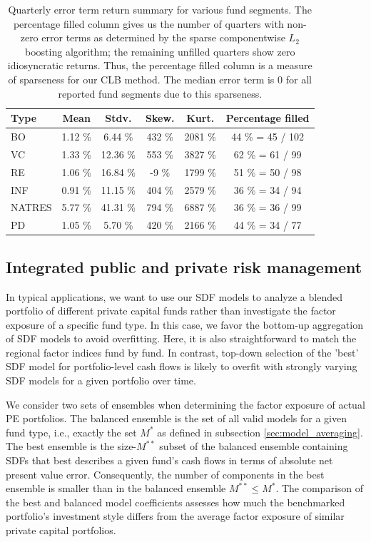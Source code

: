 \documentclass[12pt]{article}
\begin{document}
\begin{table}[ht]
	\centering
	\begin{tabular}{l | c c c c | c}
		Type & Mean  & Stdv. & Skew. & Kurt.  & Percentage filled \\ 
		\hline 
		\hline
		BO & 1.12 \% & 6.44 \% & 432 \% & 2081 \% & 44 \% = 45 / 102  \\ 
		VC & 1.33 \% & 12.36 \% &  553 \% & 3827 \% & 62 \% = 61 / 99 \\ 
		RE & 1.06 \% & 16.84 \% & -9 \% & 1799 \% & 51 \% = 50 / 98 \\ 
		INF & 0.91 \% & 11.15 \% & 404 \% & 2579 \% & 36 \% = 34 / 94  \\ 
		NATRES  & 5.77 \% & 41.31 \% & 794 \% & 6887 \% & 36 \% = 36 / 99 \\ 
		PD & 1.05 \% & 5.70 \% & 420 \% & 2166 \% & 44 \% = 34 / 77 \\ 
		\hline 
		\hline 
	\end{tabular} 
	\caption{
		Quarterly error term return summary for various fund segments.
		The percentage filled column gives us the number of quarters with non-zero error terms as determined by the sparse componentwise $L_2$ boosting algorithm; the remaining unfilled quarters show zero idiosyncratic returns.
		Thus, the percentage filled column is a measure of sparseness for our CLB method.
		The median error term is 0 for all reported fund segments due to this sparseness.
	}
\label{tab:error_summary}
\end{table}

\iffalse

\subsection{Integrated public and private risk management}
\label{sec:integrated_risk}

In typical applications, we want to use our SDF models to analyze a blended portfolio of different private capital funds rather than investigate the factor exposure of a specific fund type.
In this case, we favor the bottom-up aggregation of SDF models to avoid overfitting.
Here, it is also straightforward to match the regional factor indices fund by fund.
In contrast, top-down selection of the 'best' SDF model for portfolio-level cash flows is likely to overfit with strongly varying SDF models for a given portfolio over time.

We consider two sets of ensembles when determining the factor exposure of actual PE portfolios.
The balanced ensemble is the set of all valid models for a given fund type, i.e., exactly the set $M^*$ as defined in subsection \ref{sec:model_averaging}.
The best ensemble is the size-$M^{**}$ subset of the balanced ensemble containing SDFs that best describes a given fund's cash flows in terms of absolute net present value error. 
Consequently, the number of components in the best ensemble is smaller than in the balanced ensemble $M^{**} \leq M^*$.
The comparison of the best and balanced model coefficients assesses how much the benchmarked portfolio's investment style differs from the average factor exposure of similar private capital portfolios.
\end{document}
